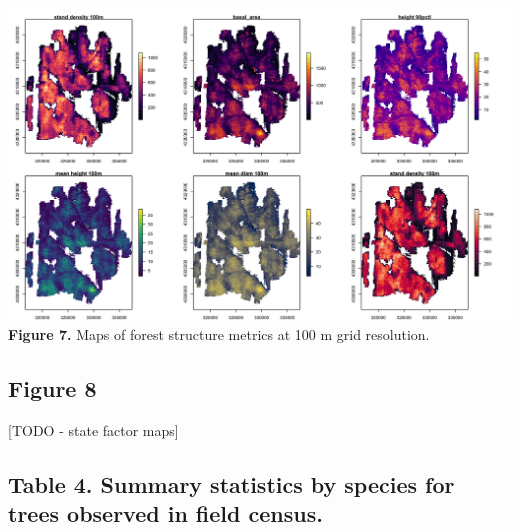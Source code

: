 \documentclass[
  12pt,
]{article}
\begin{document}
\includegraphics{./Figures/Fig5.png} \textbf{Figure 7.} Maps of forest
structure metrics at 100 m grid resolution. \clearpage

\newpage

\subsection{Figure 8}\label{figure-8}

{[}TODO - state factor maps{]}

\subsection{Table 4. Summary statistics by species for trees observed in
field
census.}\label{table-4.-summary-statistics-by-species-for-trees-observed-in-field-census.}
\end{document}
